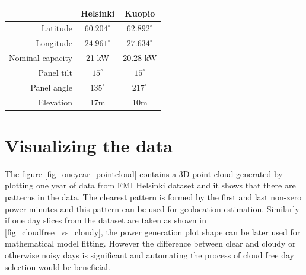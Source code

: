 


\begin{table}[H]
\centering
\begin{tabular}{r|cc} \hline\hline

 & Helsinki & Kuopio\\ \hline
 Latitude & $60.204^\circ$ & $62.892^\circ$ \\
 Longitude & $24.961^\circ$  &  $27.634^\circ$\\
 Nominal capacity &21 kW & 20.28 kW \\
 Panel tilt & $15^\circ$ & $15^\circ$ \\
 Panel angle & $135^\circ$ & $217^\circ$ \\
 Elevation & 17m & 10m\\
\hline\hline
\end{tabular}
\label{table_fmi_helsinki_kuopio_parameters}
\end{table}





\section{Visualizing the data}
The figure \ref{fig_oneyear_pointcloud} contains a 3D point cloud generated by plotting one year of data from FMI Helsinki dataset and it shows that there are patterns in the data. The clearest pattern is formed by the first and last non-zero power minutes and this pattern can be used for geolocation estimation. Similarly if one day slices from the dataset are taken as shown in \ref{fig_cloudfree_vs_cloudy}, the power generation plot shape can be later used for mathematical model fitting. However the difference between clear and cloudy or otherwise noisy days is significant and automating the process of cloud free day selection would be beneficial.



